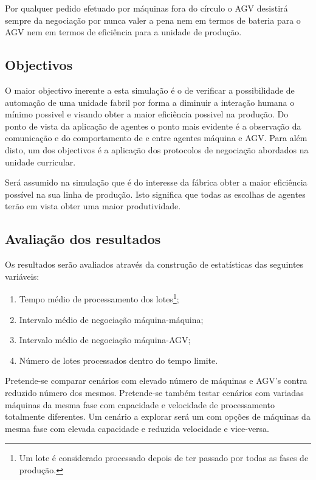 \begin{titlepage}
Por qualquer pedido efetuado por máquinas fora do círculo o AGV desistirá sempre da negociação por nunca valer a pena nem em termos de bateria para o AGV nem em termos de eficiência para a unidade de produção.

\subsection{Objectivos}
\justify\normalsize
O maior objectivo inerente a esta simulação é o de verificar a possibilidade de automação de uma unidade fabril por forma a diminuir a interação humana o mínimo possivel e visando obter a maior eficiência possivel na produção. Do ponto de vista da aplicação de agentes o ponto mais evidente é a observação da comunicação e do comportamento de e entre agentes máquina e AGV. Para além disto, um dos objectivos é a aplicação dos protocolos de negociação abordados na unidade curricular.

Será assumido na simulação que é do interesse da fábrica obter a maior eficiência possível na sua linha de produção. Isto significa que todas as escolhas de agentes terão em vista obter uma maior produtividade.

\subsection{Avaliação dos resultados} \label{ssec:evaluation}
\justify\normalsize
Os resultados serão avaliados através da construção de estatísticas das seguintes variáveis:

\begin{enumerate}
\item Tempo médio de processamento dos lotes\footnote{Um lote é considerado processado depois de ter passado por todas as fases de produção.};
\item Intervalo médio de negociação máquina-máquina;
\item Intervalo médio de negociação máquina-AGV;
\item Número de lotes processados dentro do tempo limite.
\end{enumerate}

Pretende-se comparar cenários com elevado número de máquinas e AGV's contra reduzido número dos mesmos. Pretende-se também testar cenários com variadas máquinas da mesma fase com capacidade e velocidade de processamento totalmente diferentes. Um cenário a explorar será um com opções de máquinas da mesma fase com elevada capacidade e reduzida velocidade e vice-versa.


\end{titlepage}

